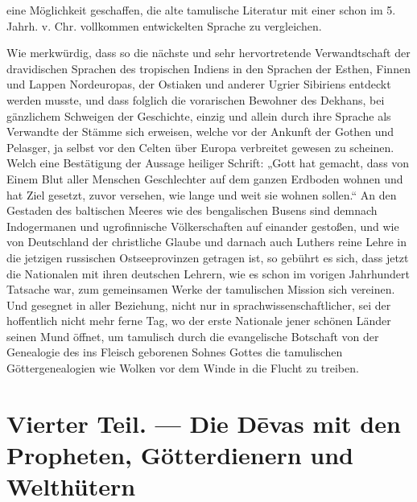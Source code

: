 \documentclass{article}
\begin{document}
eine Möglichkeit geschaffen, die alte tamulische Literatur mit einer schon im 5. Jahrh. v. Chr. vollkommen entwickelten Sprache zu vergleichen.

Wie merkwürdig, dass so die nächste und sehr hervortretende Verwandtschaft der dravidischen Sprachen des tropischen Indiens in den Sprachen der Esthen, Finnen und Lappen Nordeuropas, der Ostiaken und anderer Ugrier Sibiriens entdeckt werden musste, und dass folglich die vorarischen Bewohner des Dekhans, bei gänzlichem Schweigen der Geschichte, einzig und allein durch ihre Sprache als Verwandte der Stämme sich erweisen, welche vor der Ankunft der Gothen und Pelasger, ja selbst vor den Celten über Europa verbreitet gewesen zu scheinen. Welch eine Bestätigung der Aussage heiliger Schrift: „Gott hat gemacht, dass von Einem Blut aller Menschen Geschlechter auf dem ganzen Erdboden wohnen und hat Ziel gesetzt, zuvor versehen, wie lange und weit sie wohnen sollen.“ An den Gestaden des baltischen Meeres wie des bengalischen Busens sind demnach Indogermanen und ugrofinnische Völkerschaften auf einander gestoßen, und wie von Deutschland der christliche Glaube und darnach auch Luthers reine Lehre in die jetzigen russischen Ostseeprovinzen getragen ist, so gebührt es sich, dass jetzt die Nationalen mit ihren deutschen Lehrern, wie es schon im vorigen Jahrhundert Tatsache war, zum gemeinsamen Werke der tamulischen Mission sich vereinen. Und gesegnet in aller Beziehung, nicht nur in sprachwissenschaftlicher, sei der hoffentlich nicht mehr ferne Tag, wo der erste Nationale jener schönen Länder seinen Mund öffnet, um tamulisch durch die evangelische Botschaft von der Genealogie des ins Fleisch geborenen Sohnes Gottes die tamulischen Göttergenealogien wie Wolken vor dem Winde in die Flucht zu treiben.

\clearpage
\section{Vierter Teil. — Die D\={e}vas mit den Propheten, Götterdienern und Welthütern}
\end{document}
